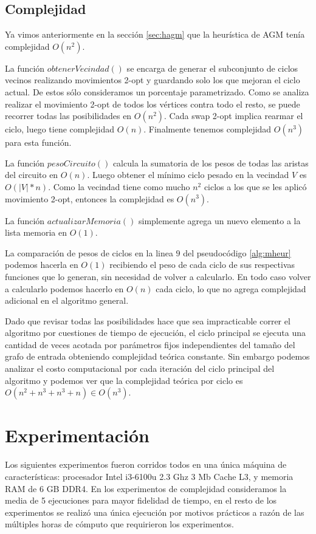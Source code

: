 \documentclass[10pt,a4paper]{article}
\begin{document}
\subsection{Complejidad}
Ya vimos anteriormente en la sección \ref{sec:hagm} que la heurística de AGM tenía complejidad $O(n^2)$.

La función $obtenerVecindad()$ se encarga de generar el subconjunto de ciclos vecinos realizando movimientos 2-opt y guardando solo los que mejoran el ciclo actual. De estos sólo consideramos un porcentaje parametrizado. Como se analiza realizar el movimiento 2-opt de todos los vértices contra todo el resto, se puede recorrer todas las posibilidades en $O(n^2)$. Cada swap 2-opt implica rearmar el ciclo, luego tiene complejidad $O(n)$. Finalmente tenemos complejidad $O(n^3)$ para esta función. 

La función $pesoCircuito()$ calcula la sumatoria de los pesos de todas las aristas del circuito en $O(n)$. Luego obtener el mínimo ciclo pesado en la vecindad $V$ es $O(|V| * n)$. Como la vecindad tiene como mucho $n^2$ ciclos a los que se les aplicó movimiento 2-opt, entonces la complejidad es $O(n^3)$.

La función $actualizarMemoria()$ simplemente agrega un nuevo elemento a la lista memoria en $O(1)$.

La comparación de pesos de ciclos en la linea $9$ del pseudocódigo \ref{alg:mheur} podemos hacerla en $O(1)$ recibiendo el peso de cada ciclo de sus respectivas funciones que lo generan, sin necesidad de volver a calcularlo. En todo caso volver a calcularlo podemos hacerlo en $O(n)$ cada ciclo, lo que no agrega complejidad adicional en el algoritmo general.

Dado que revisar todas las posibilidades hace que sea impracticable correr el algoritmo por cuestiones de tiempo de ejecución, el ciclo principal se ejecuta una cantidad de veces acotada por parámetros fijos independientes del tamaño del grafo de entrada obteniendo complejidad teórica constante. Sin embargo podemos analizar el costo computacional por cada iteración del ciclo principal del algoritmo y podemos ver que la complejidad teórica por ciclo es $O(n^2 + n^3 + n^3 + n) \in O(n^3)$.

\newpage    
\section{Experimentación}
Los siguientes experimentos fueron corridos todos en una única máquina de características: procesador Intel i3-6100u 2.3 Ghz 3 Mb Cache L3, y memoria RAM de 6 GB DDR4. En los experimentos de complejidad consideramos la media de 5 ejecuciones para mayor fidelidad de tiempo, en el resto de los experimentos se realizó una única ejecución por motivos prácticos a razón de las múltiples horas de cómputo que requirieron los experimentos. 
\end{document}
